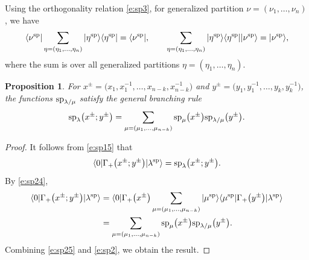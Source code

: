 \documentclass[10pt,a4paper]{amsart}
\numberwithin{equation}{section}
\newtheorem{Proposition}[Theorem]{Proposition}
 { \theoremstyle{definition}
\newtheorem{Definition}[Theorem]{Definition}
\newtheorem{Note}[Theorem]{Note}
\newtheorem{Example}[Theorem]{Example}
\newtheorem{Remark}[Theorem]{Remark} }
\begin{document}
Using the orthogonality relation \eqref{e:sp3}, for generalized partition $\nu=(\nu_1,\dots,\nu_n)$, we have
\begin{align}
\label{e:sp24}\langle\nu^{\rm sp}|\sum_{\eta=(\eta_1,\dots,\eta_n)}|\eta^{\rm sp}\rangle\langle\eta^{\rm sp}| = \langle\nu^{\rm sp}|,\qquad
\sum_{\eta=(\eta_1,\dots,\eta_n)}|\eta^{\rm sp}\rangle\langle\eta^{\rm sp}||\nu^{\rm sp}\rangle = |\nu^{\rm sp}\rangle,
\end{align}
where the sum is over all generalized partitions $\eta=(\eta_1,\dots,\eta_n)$.

\begin{Proposition}\label{e:pro10}For $x^{\pm}=\big(x_1,x^{-1}_1,\dots,x_{n-k},x^{-1}_{n-k}\big)$ and $y^{\pm}=\big(y_1,y^{-1}_1,\dots,y_{k},y^{-1}_{k}\big)$, the functions ${\rm sp}_{\lambda/\mu}$ satisfy the general branching rule
\begin{align}\label{e:sp30}
{\rm sp}_\lambda\big(x^{\pm};y^{\pm}\big)=\sum_{\mu=(\mu_1,\dots,\mu_{n-k})}{\rm sp}_\mu\big(x^{\pm}\big){\rm sp}_{\lambda/\mu}\big(y^{\pm}\big).
\end{align}
\end{Proposition}

\begin{proof}
It follows from \eqref{e:sp15} that
\begin{align}\label{e:sp25}
\langle0|\Gamma_{+}\big(x^{\pm};y^{\pm}\big)|\lambda^{\rm sp}\rangle={\rm sp}_\lambda\big(x^{\pm};y^{\pm}\big).
\end{align}
By \eqref{e:sp24},
\begin{align}
\langle0|\Gamma_{+}\big(x^{\pm};y^{\pm}\big)|\lambda^{\rm sp}\rangle&=\langle0|\Gamma_{+}\big(x^{\pm}\big)\sum_{\mu=(\mu_1,\dots,\mu_{n-k})}|\mu^{\rm sp}\rangle\langle\mu^{\rm sp}|\Gamma_{+}\big(y^{\pm}\big)|\lambda^{\rm sp}\rangle\nonumber\\
&=\sum_{\mu=(\mu_1,\dots,\mu_{n-k})}{\rm sp}_\mu\big(x^{\pm}\big){\rm sp}_{\lambda/\mu}\big(y^{\pm}\big).\label{e:sp2}
\end{align}
Combining \eqref{e:sp25} and \eqref{e:sp2}, we obtain the result.
\end{proof}
\end{document}
